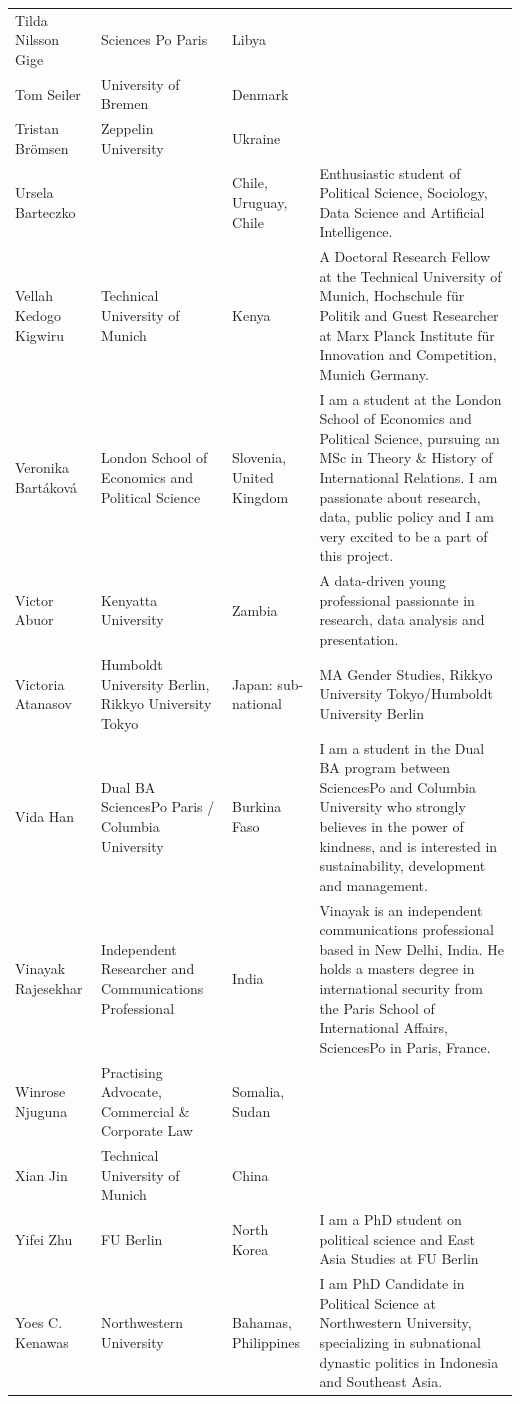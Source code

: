\documentclass[
]{article}
\begin{document}
\begin{longtable}[t]{l>{\raggedright\arraybackslash}p{2cm}>{\raggedright\arraybackslash}p{2cm}>{\raggedright\arraybackslash}p{3cm}}
\addlinespace
\rowcolor{gray!6}  Tilda Nilsson Gige & Sciences Po Paris & Libya & \\
Tom Seiler & University of Bremen & Denmark & \\
\rowcolor{gray!6}  Tristan Brömsen & Zeppelin University & Ukraine & \\
Ursela Barteczko &  & Chile, Uruguay, Chile & Enthusiastic student of Political Science, Sociology, Data Science and Artificial Intelligence.\\
\rowcolor{gray!6}  Vellah Kedogo Kigwiru & Technical University of Munich & Kenya & A Doctoral Research Fellow at the Technical University of Munich, Hochschule für Politik and Guest Researcher at Marx Planck Institute für Innovation and Competition, Munich Germany.\\
\addlinespace
Veronika Bartáková & London School of Economics and Political Science & Slovenia, United Kingdom & I am a student at the London School of Economics and Political Science, pursuing an MSc in Theory \& History of International Relations. I am passionate about research, data, public policy and I am very excited to be a part of this project.\\
\rowcolor{gray!6}  Victor Abuor & Kenyatta University & Zambia & A data-driven young professional passionate in research, data analysis and presentation.\\
Victoria Atanasov & Humboldt University Berlin, Rikkyo University Tokyo & Japan: sub-national & MA Gender Studies, Rikkyo University Tokyo/Humboldt University Berlin\\
\rowcolor{gray!6}  Vida Han & Dual BA SciencesPo Paris / Columbia University & Burkina Faso & I am a student in the Dual BA program between SciencesPo and Columbia University who strongly believes in the power of kindness, and is interested in sustainability, development and management.\\
Vinayak Rajesekhar & Independent Researcher and Communications Professional & India & Vinayak is an independent communications professional based in New Delhi, India. He holds a masters degree in international security from the Paris School of International Affairs, SciencesPo in Paris, France.\\
\addlinespace
\rowcolor{gray!6}  Winrose Njuguna & Practising Advocate, Commercial \& Corporate Law & Somalia, Sudan & \\
Xian Jin & Technical University of Munich & China & \\
\rowcolor{gray!6}  Yifei Zhu & FU Berlin & North Korea & I am a PhD student on political science and East Asia Studies at FU Berlin\\
Yoes C. Kenawas & Northwestern University & Bahamas, Philippines & I am PhD Candidate in Political Science at Northwestern University, specializing in subnational dynastic politics in Indonesia and Southeast Asia.\\
\bottomrule
\end{longtable}
\end{document}
